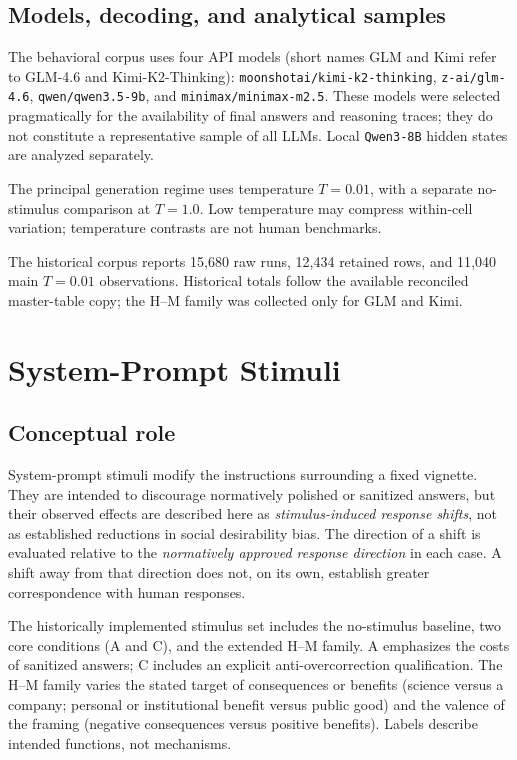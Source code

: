 \documentclass[14pt,a4paper]{extarticle}
\begin{document}
\subsection{Models, decoding, and analytical samples}

The behavioral corpus uses four API models (short names GLM and Kimi refer to GLM-4.6 and Kimi-K2-Thinking): \texttt{moonshotai/kimi-k2-thinking}, \texttt{z-ai/glm-4.6}, \texttt{qwen/qwen3.5-9b}, and \texttt{minimax/minimax-m2.5}. These models were selected pragmatically for the availability of final answers and reasoning traces; they do not constitute a representative sample of all LLMs. Local \texttt{Qwen3-8B} hidden states are analyzed separately.

The principal generation regime uses temperature $T=0.01$, with a separate no-stimulus comparison at $T=1.0$. Low temperature may compress within-cell variation; temperature contrasts are not human benchmarks.

The historical corpus reports 15{,}680 raw runs, 12{,}434 retained rows, and 11{,}040 main $T=0.01$ observations. Historical totals follow the available reconciled master-table copy; the H--M family was collected only for GLM and Kimi.

\section{System-Prompt Stimuli}

\subsection{Conceptual role}

System-prompt stimuli modify the instructions surrounding a fixed vignette. They are intended to discourage normatively polished or sanitized answers, but their observed effects are described here as \emph{stimulus-induced response shifts}, not as established reductions in social desirability bias. The direction of a shift is evaluated relative to the \emph{normatively approved response direction} in each case. A shift away from that direction does not, on its own, establish greater correspondence with human responses.

The historically implemented stimulus set includes the no-stimulus baseline, two core conditions (A and C), and the extended H--M family. A emphasizes the costs of sanitized answers; C includes an explicit anti-overcorrection qualification. The H--M family varies the stated target of consequences or benefits (science versus a company; personal or institutional benefit versus public good) and the valence of the framing (negative consequences versus positive benefits). Labels describe intended functions, not mechanisms.
\end{document}
